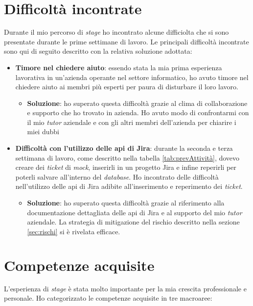 \section{Difficoltà incontrate}
Durante il mio percorso di \textit{stage} ho incontrato alcune difficiolta che si sono presentate durante le prime settimane di lavoro. Le principali difficoltà incontrate sono qui di seguito descritto con la relativa soluzione adottata:
\begin{itemize}
    \item \textbf{Timore nel chiedere aiuto}: essendo stata la mia prima esperienza lavorativa in un'azienda operante nel settore informatico, ho avuto timore nel chiedere aiuto ai membri più esperti per paura di disturbare il loro lavoro. 
        \begin{itemize} 
        \item \textbf{Soluzione}: ho superato questa difficoltà grazie al clima di collaborazione e supporto che ho trovato in azienda. Ho avuto modo di confrontarmi con il mio \textit{tutor} aziendale e con gli altri membri dell'azienda per chiarire i miei dubbi
        \end{itemize}
    \item \textbf{Difficoltà con l'utilizzo delle \gls{api} di Jira}: durante la seconda e terza settimana di lavoro, come descritto nella tabella \ref{tab:prevAttività}, dovevo creare dei \textit{ticket} di \textit{mock}, inserirli in un progetto Jira e infine reperirli per poterli salvare all'interno del \textit{database}. Ho incontrato delle difficoltà nell'utilizzo delle \gls{api} di Jira adibite all'inserimento e reperimento dei \textit{ticket}. \begin{itemize} \item \textbf{Soluzione}: ho superato questa difficoltà grazie al riferimento alla documentazione dettagliata delle \gls{api} di Jira e al supporto del mio \textit{tutor} aziendale. La strategia di mitigazione del rischio descritto nella sezione \ref{sec:rischi} si è rivelata efficace. \end{itemize}
\end{itemize}

\section{Competenze acquisite}
L'esperienza di \textit{stage} è stata molto importante per la mia crescita professionale e personale. Ho categorizzato le competenze acquisite in tre macroaree:

